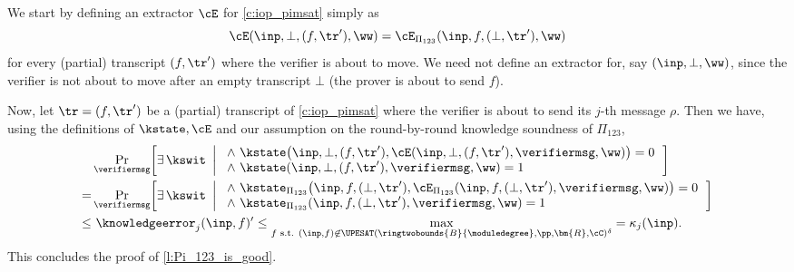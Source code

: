 We start by defining an extractor $\cE$ for \cref{c:iop_pimsat} simply as $$\cE(\inp,\bot, (f,\tr'),\ww)= \cE_{\Pi_{123}}(\inp,f, (\bot,\tr'), \ww)$$ for every (partial) transcript $(f,\tr')$ where the verifier is about to move. We need not define an extractor for, say $(\inp, \bot, \ww)$, since the verifier is not about to move after an empty transcript $\bot$ (the prover is about to send $f$).
%

%
Now, let $\tr=(f,\tr')$ be a (partial)  transcript of \cref{c:iop_pimsat} where the verifier is about to send its $j$-th message $\rho$. Then we have, using the definitions of $\kstate, \cE$ and our assumption on the round-by-round knowledge soundness of $\Pi_{123}$,
%
\begin{align*}
  &\Pr_{\verifiermsg}\!\left[
  \exists\,\kswit \ \left| \ \begin{array}{l}
  \wedge\ \kstate\bigl(\inp,\bot,(f,\tr'),\cE(\inp,\bot, (f,\tr'),\verifiermsg,\ww)\bigr)=0\\
  \wedge\ \kstate(\inp,\bot, (f,\tr'),\verifiermsg,\ww)=1
  \end{array}
  \right.\right]\\ = 
  &\Pr_{\verifiermsg}\!\left[
  \exists\,\kswit \ \left| \ \begin{array}{l}
  \wedge\ \kstate_{\Pi_{123}}\bigl(\inp,f,(\bot,\tr'),\cE_{\Pi_{123}}(\inp,f, (\bot,\tr'),\verifiermsg,\ww)\bigr)=0\\
  \wedge\ \kstate_{\Pi_{123}}(\inp,f,(\bot,\tr'),\verifiermsg,\ww)=1
  \end{array}
  \right.\right] \\ \le&\ \knowledgeerror_j(\inp, f)' \leq \max_{f \text{ s.t. } (\inp,f)\not\in \UPESAT(\ringtwobounds{B}{\moduledegree}, \pp,\bm{R}, \cC)^\delta} = \kappa_j(\inp).
\end{align*}
%
This concludes the proof of \cref{l:Pi_123_is_good}.



